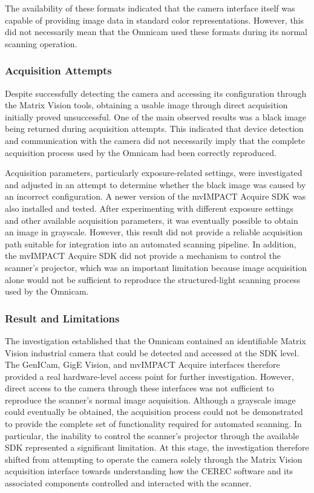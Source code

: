 The availability of these formats indicated that the camera interface itself was capable of providing image data in standard color representations. However, this did not necessarily mean that the Omnicam used these formats during its normal scanning operation.

\subsubsection{Acquisition Attempts}

Despite successfully detecting the camera and accessing its configuration through the Matrix Vision tools, obtaining a usable image through direct acquisition initially proved unsuccessful. One of the main observed results was a black image being returned during acquisition attempts. This indicated that device detection and communication with the camera did not necessarily imply that the complete acquisition process used by the Omnicam had been correctly reproduced.

Acquisition parameters, particularly exposure-related settings, were investigated and adjusted in an attempt to determine whether the black image was caused by an incorrect configuration. A newer version of the mvIMPACT Acquire SDK was also installed and tested. After experimenting with different exposure settings and other available acquisition parameters, it was eventually possible to obtain an image in grayscale. However, this result did not provide a reliable acquisition path suitable for integration into an automated scanning pipeline. In addition, the mvIMPACT Acquire SDK did not provide a mechanism to control the scanner's projector, which was an important limitation because image acquisition alone would not be sufficient to reproduce the structured-light scanning process used by the Omnicam.

\subsubsection{Result and Limitations}

The investigation established that the Omnicam contained an identifiable Matrix Vision industrial camera that could be detected and accessed at the SDK level. The GenICam, GigE Vision, and mvIMPACT Acquire interfaces therefore provided a real hardware-level access point for further investigation. However, direct access to the camera through these interfaces was not sufficient to reproduce the scanner's normal image acquisition. Although a grayscale image could eventually be obtained, the acquisition process could not be demonstrated to provide the complete set of functionality required for automated scanning. In particular, the inability to control the scanner's projector through the available SDK represented a significant limitation. At this stage, the investigation therefore shifted from attempting to operate the camera solely through the Matrix Vision acquisition interface towards understanding how the CEREC software and its associated components controlled and interacted with the scanner.


